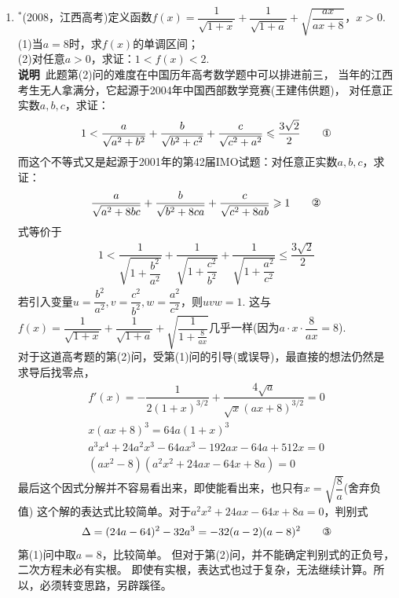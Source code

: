 \begin{enumerate}[label={【\textbf{例\thechapter.\arabic*}】},
 leftmargin=\inteval{\myenumleftmargin}pt,
 itemsep=\inteval{\myenumitempsep}pt,
 itemindent=\inteval{\myenumitemindent}pt]
\item $ ^* $(2008，江西高考)定义函数$ f(x)=\dfrac{1}{\sqrt{1+x}}+
\dfrac{1}{\sqrt{1+a}}+\sqrt{\dfrac{ax}{ax+8}} $，$ x>0 $. \\
(1)当$ a=8 $时，求$ f(x) $的单调区间；\\
(2)对任意$ a>0 $，求证：$ 1<f(x)<2 $. \\
\textbf{说明}\ 此题第(2)问的难度在中国历年高考数学题中可以排进前三，
当年的江西考生无人拿满分，它起源于2004年中国西部数学竞赛(王建伟供题)，
对任意正实数$ a,b,c $，求证：
\begin{gather*}
    1<\dfrac{a}{\sqrt{a^2+b^2}}+\dfrac{b}{\sqrt{b^2+c^2}}+
    \dfrac{c}{\sqrt{c^2+a^2}}\leq \dfrac{3\sqrt{2}}{2}  \tag*{\ding{172}}
\end{gather*}
而这个不等式又是起源于2001年的第42届IMO试题：对任意正实数$ a,b,c $，求证：
\begin{gather*}
    \dfrac{a}{\sqrt{a^2+8bc}}+\dfrac{b}{\sqrt{b^2+8ca}}+
    \dfrac{c}{\sqrt{c^2+8ab}}\geq 1  \tag*{\ding{173}}
\end{gather*}
式等价于
\begin{gather*}
    1<\dfrac{1}{\sqrt{1+\dfrac{b^2}{a^2}}}+\dfrac{1}{\sqrt{1+\dfrac{c^2}{b^2}}}+
    \dfrac{1}{\sqrt{1+\dfrac{a^2}{c^2}}}\leq \dfrac{3\sqrt{2}}{2} 
\end{gather*}
若引入变量$ u=\dfrac{b^2}{a^2},v=\dfrac{c^2}{b^2},w=\dfrac{a^2}{c^2} $，则$ uvw=1 $.
这与$ f(x)=\dfrac{1}{\sqrt{1+x}}+\dfrac{1}{\sqrt{1+a}}+\sqrt{\dfrac{1}{1+
\frac{8}{ax}}} $几乎一样(因为$a\cdot x \cdot \dfrac{8}{ax}=8 $). \\
对于这道高考题的第(2)问，受第(1)问的引导(或误导)，最直接的想法仍然是求导后找零点，
\begin{gather*}
    f'(x)=-\dfrac{1}{2(1+x)^{3/2}}+\dfrac{4\sqrt{a}}{\sqrt{x}(ax+8)^{3/2}}=0 \\
    x(ax+8)^3=64a(1+x)^3 \\
    a^3x^4+24a^2x^3-64ax^3-192ax-64a+512x=0\\
    (ax^2-8)(a^2x^2+24ax-64x+8a)=0
\end{gather*}
最后这个因式分解并不容易看出来，即使能看出来，也只有$ x=\sqrt{\dfrac{8}{a}} $(舍弃负值)
这个解的表达式比较简单。对于$ a^2x^2+24ax-64x+8a=0 $，判别式
\begin{align}
    \Delta=(24a-64)^2-32a^3=-32(a-2)(a-8)^2 \tag*{\ding{174}}
\end{align}
第(1)问中取$ a=8 $，比较简单。
但对于第(2)问，并不能确定判别式的正负号，二次方程未必有实根。
即使有实根，表达式也过于复杂，无法继续计算。所以，必须转变思路，另辟蹊径。\\

\end{enumerate}
